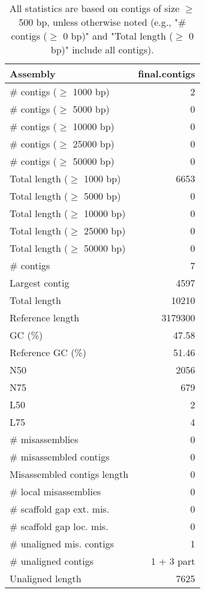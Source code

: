 \documentclass[12pt,a4paper]{article}
\begin{document}
\begin{table}[ht]
\begin{center}
\caption{All statistics are based on contigs of size $\geq$ 500 bp, unless otherwise noted (e.g., "\# contigs ($\geq$ 0 bp)" and "Total length ($\geq$ 0 bp)" include all contigs).}
\begin{tabular}{|l*{1}{|r}|}
\hline
Assembly & final.contigs \\ \hline
\# contigs ($\geq$ 1000 bp) & 2 \\ \hline
\# contigs ($\geq$ 5000 bp) & 0 \\ \hline
\# contigs ($\geq$ 10000 bp) & 0 \\ \hline
\# contigs ($\geq$ 25000 bp) & 0 \\ \hline
\# contigs ($\geq$ 50000 bp) & 0 \\ \hline
Total length ($\geq$ 1000 bp) & 6653 \\ \hline
Total length ($\geq$ 5000 bp) & 0 \\ \hline
Total length ($\geq$ 10000 bp) & 0 \\ \hline
Total length ($\geq$ 25000 bp) & 0 \\ \hline
Total length ($\geq$ 50000 bp) & 0 \\ \hline
\# contigs & 7 \\ \hline
Largest contig & 4597 \\ \hline
Total length & 10210 \\ \hline
Reference length & 3179300 \\ \hline
GC (\%) & 47.58 \\ \hline
Reference GC (\%) & 51.46 \\ \hline
N50 & 2056 \\ \hline
N75 & 679 \\ \hline
L50 & 2 \\ \hline
L75 & 4 \\ \hline
\# misassemblies & 0 \\ \hline
\# misassembled contigs & 0 \\ \hline
Misassembled contigs length & 0 \\ \hline
\# local misassemblies & 0 \\ \hline
\# scaffold gap ext. mis. & 0 \\ \hline
\# scaffold gap loc. mis. & 0 \\ \hline
\# unaligned mis. contigs & 1 \\ \hline
\# unaligned contigs & 1 + 3 part \\ \hline
Unaligned length & 7625 \\ \hline

\end{tabular}
\end{center}
\end{table}
\end{document}
